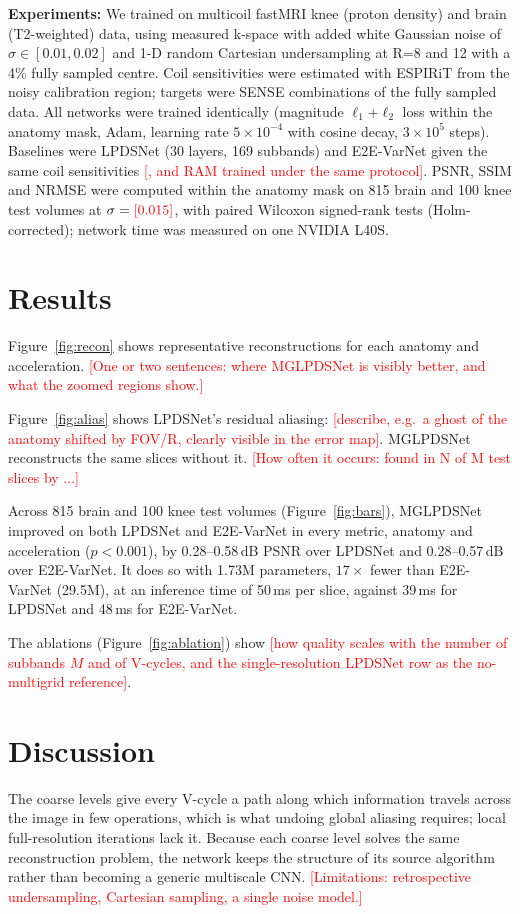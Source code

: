 \documentclass[10pt]{article}
\newcommand{\todo}[1]{\textcolor{red}{[#1]}}
\begin{document}
\textbf{Experiments:} We trained on multicoil fastMRI\cite{ref_fastmri} knee (proton density) and
brain (T2-weighted) data, using measured k-space with added white Gaussian noise of
$\sigma\in[0.01,0.02]$ and 1-D random Cartesian undersampling at R=8 and 12 with a 4\% fully
sampled centre. Coil sensitivities were estimated with ESPIRiT from the noisy calibration region;
targets were SENSE combinations of the fully sampled data. All networks were trained identically
(magnitude $\ell_1$+$\ell_2$ loss within the anatomy mask, Adam, learning rate $5\times10^{-4}$
with cosine decay, $3\times10^5$ steps). Baselines were LPDSNet\cite{ref_lpdsnet} (30 layers,
169 subbands) and E2E-VarNet\cite{ref_varnet} given the same coil sensitivities
\todo{, and RAM\cite{ref_ram} trained under the same protocol}. PSNR, SSIM and NRMSE were computed
within the anatomy mask on 815 brain and 100 knee test volumes at $\sigma=\todo{0.015}$, with paired Wilcoxon
signed-rank tests (Holm-corrected); network time was measured on one NVIDIA L40S.

\section*{Results}
Figure~\ref{fig:recon} shows representative reconstructions for each anatomy and acceleration.
\todo{One or two sentences: where MGLPDSNet is visibly better, and what the zoomed regions show.}

Figure~\ref{fig:alias} shows LPDSNet's residual aliasing: \todo{describe, e.g.\ a ghost of the
anatomy shifted by FOV/R, clearly visible in the error map}. MGLPDSNet reconstructs the same slices
without it. \todo{How often it occurs: found in N of M test slices by ...}

Across 815 brain and 100 knee test volumes (Figure~\ref{fig:bars}), MGLPDSNet improved on both
LPDSNet and E2E-VarNet in every metric, anatomy and acceleration ($p<0.001$), by
0.28--0.58\,dB PSNR over LPDSNet and 0.28--0.57\,dB over E2E-VarNet. It does so with 1.73M parameters, $17\times$ fewer than E2E-VarNet (29.5M), at an inference time of
50\,ms per slice, against 39\,ms for LPDSNet and 48\,ms for E2E-VarNet.

The ablations (Figure~\ref{fig:ablation}) show \todo{how quality scales with the number of
subbands $M$ and of V-cycles, and the single-resolution LPDSNet row as the no-multigrid reference}.

\section*{Discussion}
The coarse levels give every V-cycle a path along which information travels across the image in
few operations, which is what undoing global aliasing requires; local full-resolution iterations
lack it. Because each coarse level solves the same reconstruction problem, the network keeps the
structure of its source algorithm rather than becoming a generic multiscale CNN.
\todo{Limitations: retrospective undersampling, Cartesian sampling, a single noise model.}
\end{document}
